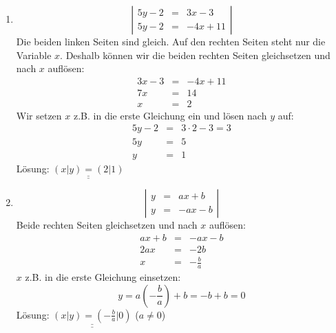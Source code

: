 \documentclass[%
11pt,%
twoside,%
titlepage,%
german,%
]{scrartcl}
\newcommand{\result}[1]{\underline{\underline{#1}}}
\begin{document}
\begin{enumerate}
\begin{enumerate}
  \item 
    \begin{displaymath}
      \left| 
        \begin{array}{rcl}
          5y-2 & = & 3x-3 \\
          5y-2 & = & -4x+11
        \end{array} \right|
    \end{displaymath}
    Die beiden linken Seiten sind gleich. Auf den rechten Seiten steht nur die Variable $x$. Deshalb k\"onnen wir die beiden rechten Seiten gleichsetzen und nach $x$ aufl\"osen:
    \begin{eqnarray*}
      3x-3 & = & -4x+11 \\
      7x & = & 14 \\
      x & = & 2
    \end{eqnarray*}
    Wir setzen $x$ z.B. in die erste Gleichung ein und l\"osen nach $y$ auf:
    \begin{eqnarray*}
      5y-2 & = & 3\cdot 2 - 3 = 3 \\
      5y & = & 5 \\
      y & = & 1
    \end{eqnarray*}
    L\"osung: $\result{(x|y)=(2|1)}$

  \item 
    \begin{displaymath}
      \left| 
        \begin{array}{rcl}
          y & = & ax+b \\
          y & = & -ax-b
        \end{array} \right|
    \end{displaymath}
    Beide rechten Seiten gleichsetzen und nach $x$ aufl\"osen:
    \begin{eqnarray*}
      ax+b & = & -ax-b \\
      2ax & = & -2b \\
      x & = & -\frac{b}{a}
    \end{eqnarray*}
    $x$ z.B. in die erste Gleichung einsetzen:
    \begin{displaymath}
      y = a\left(-\frac{b}{a}\right)+b = -b+b=0
    \end{displaymath}
    L\"osung: $\result{(x|y)=(-\frac{b}{a}|0)}$ ($a\neq 0$)

  \end{enumerate}



\end{enumerate}
\end{document}
